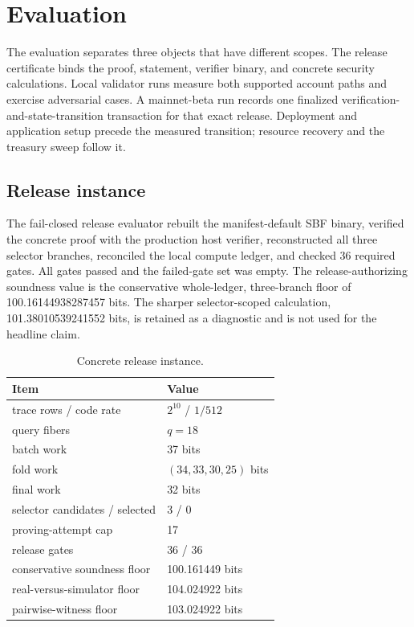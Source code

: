 \section{Evaluation}
\label{sec:evaluation}

The evaluation separates three objects that have different scopes.  The
release certificate binds the proof, statement, verifier binary, and concrete
security calculations.  Local validator runs measure both supported account
paths and exercise adversarial cases.  A mainnet-beta run records one
finalized verification-and-state-transition transaction for that exact
release.  Deployment and application setup precede the measured transition;
resource recovery and the treasury sweep follow it.

\subsection{Release instance}
\label{sec:evaluation-release}

The fail-closed release evaluator rebuilt the manifest-default SBF binary,
verified the concrete proof with the production host verifier, reconstructed
all three selector branches, reconciled the local compute ledger, and checked
36 required gates.  All gates passed and the failed-gate set was empty.  The
release-authorizing soundness value is the conservative whole-ledger,
three-branch floor of 100.16144938287457 bits.  The sharper selector-scoped
calculation, 101.38010539241552 bits, is retained as a diagnostic and is not
used for the headline claim.

\begin{table}[t]
  \centering
  \small
  \caption{Concrete \Profile{} release instance.}
  \label{tab:release-schedule}
  \begin{tabular}{l l}
    \toprule
    Item & Value \\
    \midrule
    trace rows / code rate & $2^{10}$ / $1/512$ \\
    query fibers & $q=18$ \\
    batch work & 37 bits \\
    fold work & $(34,33,30,25)$ bits \\
    final work & 32 bits \\
    selector candidates / selected & 3 / 0 \\
    proving-attempt cap & 17 \\
    release gates & 36 / 36 \\
    conservative soundness floor & 100.161449 bits \\
    real-versus-simulator floor & 104.024922 bits \\
    pairwise-witness floor & 103.024922 bits \\
    \bottomrule
  \end{tabular}
\end{table}


